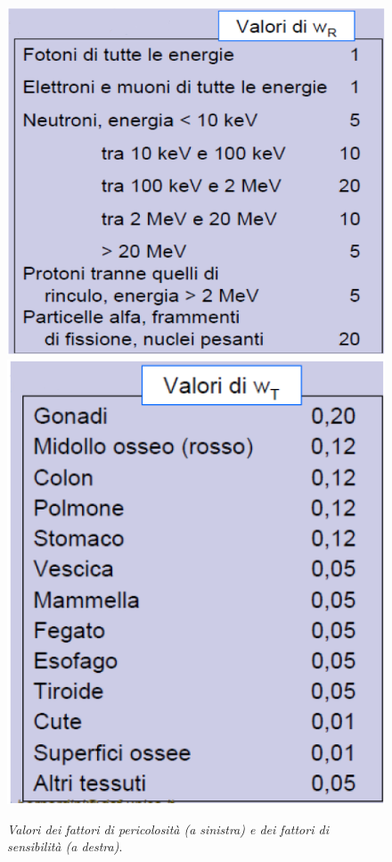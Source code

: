 \documentclass{report}
\numberwithin{equation}{section}
\numberwithin{figure}{section}
\begin{document}
\begin{figure}[htp]
\centering
\includegraphics[scale=0.4905]{immagini/wr.png}\quad\includegraphics[scale=0.47]{immagini/wt.png}
\caption{\label{fig:w} \textit{Valori dei fattori di pericolosità (a sinistra) e dei fattori di sensibilità (a destra)}.}
\end{figure}
\end{document}
